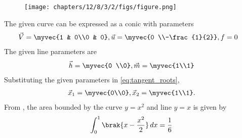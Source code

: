 	\begin{figure}[H]
		\centering
 \texttt{[image: chapters/12/8/3/2/figs/figure.png]}
		\caption{}
		\label{fig:12/8/3/2}
  	\end{figure}
The given curve  can be expressed as a conic with parameters
\begin{align}
	\vec{V} &= \myvec{1 & 0\\0 & 0}, \vec{u} = \myvec{0 \\-\frac{1}{2}}, f = 0
	\end{align}
The given line parameters are
\begin{align}
\vec{h} = \myvec{0 \\0}, \vec{m}=\myvec{1\\1}
\end{align}
Substituting the given parameters in 
\eqref{eq:tangent_roots},
\begin{align}
\vec{x}_1=\myvec{0\\0}, \vec{x}_2=\myvec{1\\1}.
\end{align}
From  
		,
the area bounded by the curve $y=x^2$ and line $y=x$ is given by
\begin{align}
	\int_{0}^{1} \brak{x 
	-\frac{x^2}{2}} \,dx = \frac{1}{6}
\end{align}

